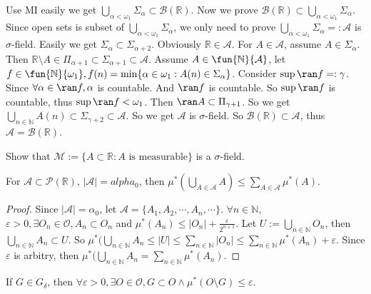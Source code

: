\documentclass{ctexart}
\begin{document}
\begin{solution}
  Use MI easily we get \(\bigcup_{\alpha < \omega_1} \Sigma_{\alpha} \subset \mathcal{B}(\mathbb{R})\). 
  Now we prove \(\mathcal{B}(\mathbb{R})\subset \bigcup_{\alpha<\omega_1} \Sigma_{\alpha}\). 
  Since open sets is subset of \(\bigcup_{\alpha<\omega_1} \Sigma_{\alpha}\), we only need to prove \(\bigcup_{\alpha<\omega_1} \Sigma_{\alpha}=:\mathcal{A}\) is \(\sigma\)-field. 
  Easily we get \(\Sigma_{\alpha} \subset \Sigma_{\alpha+2}\). 
  Obviously \(\mathbb{R} \in \mathcal{A}\). For \(A \in \mathcal{A}\), assume \(A \in \Sigma_{\alpha}\). 
  Then \(\mathbb{R}\setminus A \in \Pi_{\alpha+1} \subset \Sigma_{\alpha+1}\subset \mathcal{A}\). 
  Assume \(A \in \fun{\mathbb{N}}{\mathcal{A}}\), let \(f \in \fun{\mathbb{N}}{\omega_1},f(n)=\min\{\alpha \in \omega_1:A(n) \in \Sigma_{\alpha}\}\). 
  Consider \(\sup \ran f =:\gamma\). Since \(\forall \alpha \in \ran f,\alpha\) is countable. And \(\ran f\) is countable. 
  So \(\sup \ran f\) is countable, thus \(\sup \ran f <\omega_1\). 
  Then \(\ran A \subset \Pi_{\gamma+1} \). So we get \(\bigcup_{n \in \mathbb{N}} A(n) \subset \Sigma_{\gamma+2} \subset \mathcal{A}\). 
  So we get \(\mathcal{A} \) is \(\sigma\)-field. So \(\mathcal{B}(\mathbb{R}) \subset \mathcal{A}\), thus \(\mathcal{A}=\mathcal{B}(\mathbb{R})\). 
\end{solution}

\begin{problem}
  Show that \(\mathcal{M}:=\{A \subset \mathbb{R}:A \text{ is measurable}\}\) is a \(\sigma\)-field. 
\end{problem}

\begin{lemma}\label{lem:0}
  For \(\mathcal{A} \subset \mathcal{P}(\mathbb{R})\), \(|\mathcal{A}| = alpha_0\),
  then \(\mu^{*}(\bigcup_{A \in \mathcal{A}} A) \leq \sum_{A \in \mathcal{A}} \mu^{*}(A)\). 
\end{lemma}

\begin{proof}
  Since \(|\mathcal{A}| = \alpha_0\), let \(\mathcal{A}=\{A_1 , A_2 , \cdots , A_n , \cdots\}\).
\(\forall n \in \mathbb{N}\), \(\varepsilon>0,\exists O_n \in \mathcal{O}, A_n\subset O_n \)
  and \(\mu^{*} (A_n) \leq |O_n|+\frac{\varepsilon}{2^{n+1}}\). 
  Let \(U:= \bigcup_{ n \in \mathbb{N}} O_n\), then \(\bigcup_{ n \in \mathbb{N}} A_n\subset U\). 
  So \(\mu^{*}(\bigcup_{n \in \mathbb{N}} A_n \leq |U| \leq \sum_{n \in \mathbb{N}} |O_n| \leq \sum_{ n \in \mathbb{N}} \mu ^{*}(A_n)+\varepsilon\). 
  Since \(\varepsilon\) is arbitry, then \(\mu^*(\bigcup_{n \in \mathbb{N}} A_n = \sum_{n \in \mathbb{N}} \mu^* (A_n) \). 
\end{proof}
\begin{lemma}\label{lem:1}
  If \(G \in G_{\delta}\), then \(\forall \varepsilon >0,\exists O \in \mathcal{O},G \subset O \wedge \mu^{*}(O\setminus G)\leq \varepsilon\). 
\end{lemma}
\end{document}
